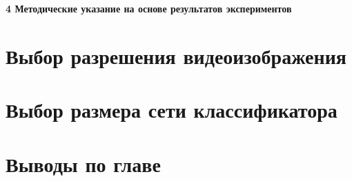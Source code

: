 \newpage
\begin{center}
  \textbf{\large 4 Методические указание на основе результатов экспериментов}
\end{center}

\section{Выбор разрешения видеоизображения}

\section{Выбор размера сети классификатора}


\section{Выводы по главе}
